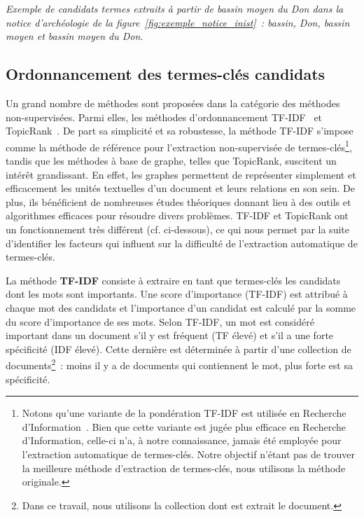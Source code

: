     \textit{Exemple de candidats termes extraits à partir de \og{}bassin moyen
    du Don\fg{} dans la notice d'archéologie de la
    figure~\ref{fig:exemple_notice_inist}~: \og{}bassin\fg{}, \og{}Don\fg{},
    \og{}bassin moyen\fg{} et \og{}bassin moyen du Don\fg{}.}

  \subsection{Ordonnancement des termes-clés candidats}
  \label{subsec:extraction_de_termes_cles}
    Un grand nombre de méthodes sont proposées dans la catégorie des méthodes
    non-supervisées. Parmi elles, les méthodes d'ordonnancement
    TF-IDF~\cite{jones1972tfidf} et TopicRank~\cite{bougouin2013topicrank}. De
    part sa simplicité et sa robustesse, la méthode TF-IDF s'impose comme la
    méthode de référence pour l'extraction non-supervisée de
    termes-clés\footnote{Notons qu'une variante de la pondération TF-IDF est
    utilisée en Recherche
    d'Information~\cite[Okapi]{robertson1999okapi,claveau2012vectorisation}.
    Bien que cette variante est jugée plus efficace en Recherche d'Information,
    celle-ci n'a, à notre connaissance, jamais été employée pour l'extraction
    automatique de termes-clés. Notre objectif n'étant pas de trouver la
    meilleure méthode d'extraction de termes-clés, nous utilisons la méthode
    originale.}, tandis que les méthodes à base de graphe, telles que TopicRank,
    suscitent un intérêt grandissant. En effet, les graphes permettent de
    représenter simplement et efficacement les unités textuelles d'un document
    et leurs relations en son sein. De plus, ils bénéficient de nombreuses
    études théoriques donnant lieu à des outils et algorithmes efficaces pour
    résoudre divers problèmes. TF-IDF et TopicRank ont un fonctionnement très
    différent (cf. ci-dessous), ce qui nous permet par la suite d'identifier les
    facteurs qui influent sur la difficulté de l'extraction automatique de
    termes-clés.

    La méthode \textbf{TF-IDF} consiste à extraire en tant que termes-clés les
    candidats dont les mots sont importants. Une score d'importance (TF-IDF) est
    attribué à chaque mot des candidats et l'importance d'un candidat est
    calculé par la somme du score d'importance de ses mots. Selon TF-IDF, un mot
    est considéré important dans un document s'il y est fréquent (TF élevé) et
    s'il a une forte spécificité (IDF élevé). Cette dernière est déterminée à
    partir d'une collection de documents\footnote{Dans ce travail, nous
    utilisons la collection dont est extrait le document.}~: moins il y a de
    documents qui contiennent le mot, plus forte est sa spécificité.

